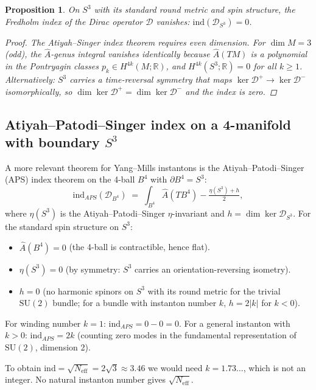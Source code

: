 \documentclass[11pt,a4paper]{article}
\newtheorem{proposition}{Proposition}
\theoremstyle{definition}
\theoremstyle{remark}
\begin{document}
\begin{proposition}
  On $S^3$ with its standard round metric and spin structure,
  the Fredholm index of the Dirac operator $\mathcal{D}$ vanishes:
  $\mathrm{ind}(\mathcal{D}_{S^3}) = 0$.
  \begin{proof}
    The Atiyah--Singer index theorem requires even dimension.
    For $\dim M = 3$ (odd), the $\hat{A}$-genus integral vanishes identically
    because $\hat{A}(TM)$ is a polynomial in the Pontryagin classes $p_k \in H^{4k}(M;\mathbb{R})$,
    and $H^{4k}(S^3;\mathbb{R}) = 0$ for all $k \geq 1$.
    Alternatively: $S^3$ carries a time-reversal symmetry that maps
    $\ker\mathcal{D}^+ \to \ker\mathcal{D}^-$ isomorphically, so
    $\dim\ker\mathcal{D}^+ = \dim\ker\mathcal{D}^-$ and the index is zero.
  \end{proof}
\end{proposition}

\subsection{Atiyah--Patodi--Singer index on a 4-manifold with boundary $S^3$}

A more relevant theorem for Yang--Mills instantons is the Atiyah--Patodi--Singer
(APS) index theorem on the 4-ball $B^4$ with $\partial B^4 = S^3$:
\begin{equation}
  \mathrm{ind}_{APS}(\mathcal{D}_{B^4}) \;=\; \int_{B^4} \hat{A}(TB^4) - \tfrac{\eta(S^3) + h}{2},
  \label{eq:APS_index}
\end{equation}
where $\eta(S^3)$ is the Atiyah--Patodi--Singer $\eta$-invariant and $h = \dim\ker\mathcal{D}_{S^3}$.
For the standard spin structure on $S^3$:
\begin{itemize}
  \item $\hat{A}(B^4) = 0$ (the 4-ball is contractible, hence flat).
  \item $\eta(S^3) = 0$ (by symmetry: $S^3$ carries an orientation-reversing isometry).
  \item $h = 0$ (no harmonic spinors on $S^3$ with its round metric for the
    trivial $\mathrm{SU}(2)$ bundle; for a bundle with instanton number $k$,
    $h = 2|k|$ for $k < 0$).
\end{itemize}
For winding number $k = 1$: $\mathrm{ind}_{APS} = 0 - 0 = 0$.
For a general instanton with $k > 0$: $\mathrm{ind}_{APS} = 2k$ (counting
zero modes in the fundamental representation of $\mathrm{SU}(2)$, dimension 2).

To obtain $\mathrm{ind} = \sqrt{N_{\mathrm{eff}}} = 2\sqrt{3} \approx 3.46$ we would need
$k = 1.73\ldots$, which is not an integer.
No natural instanton number gives $\sqrt{N_{\mathrm{eff}}}$.
\end{document}
